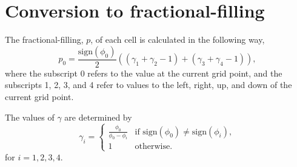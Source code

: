 \documentclass{article}
\begin{document}
\section{Conversion to fractional-filling}
The fractional-filling, $p$, of each cell is calculated in the following way,
\begin{equation}
    p_0 = \frac{\text{sign}(\phi_0)}{2}
        ((\gamma_1 + \gamma_2 - 1) + (\gamma_3 + \gamma_4 - 1)),
\end{equation}
where the subscript 0 refers to the value at the current grid point, and the subscripts 1, 2, 3, and 4 refer to values to the left, right, up, and down of the current grid point. 

The values of $\gamma$ are determined by
\begin{equation}
    \gamma_i = 
    \begin{cases}
        \frac{\phi_0}{\phi_0 - \phi_i} & 
            \text{if sign}(\phi_0) \ne \text{sign}(\phi_i), \\
        1 & \text{otherwise}.
    \end{cases}
\end{equation}
for $i = 1,2,3,4$.
\end{document}
